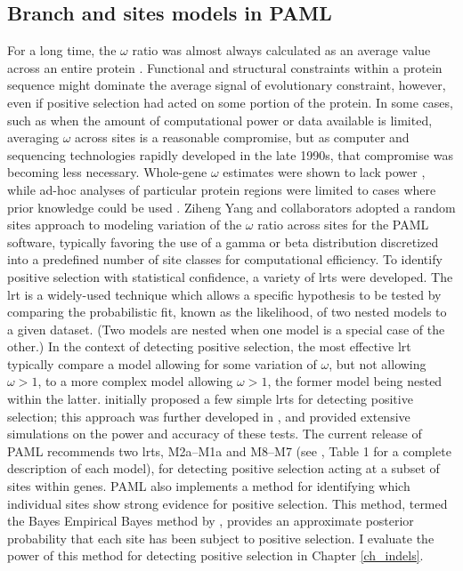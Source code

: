 \subsection{Branch and sites models in PAML}

For a long time, the $\omega$ ratio was almost always calculated as an
average value across an entire protein \citep{Sharp1997}. Functional
and structural constraints within a protein sequence might dominate
the average signal of evolutionary constraint, however, even if
positive selection had acted on some portion of the protein. In some
cases, such as when the amount of computational power or data
available is limited, averaging $\omega$ across sites is a reasonable
compromise, but as computer and sequencing technologies rapidly
developed in the late 1990s, that compromise was becoming less
necessary. Whole-gene $\omega$ estimates were shown to lack power
\citep{Endo1996}, while ad-hoc analyses of particular protein regions
were limited to cases where prior knowledge could be used
\citep{Hughes1988}. Ziheng Yang and collaborators adopted a random
sites approach to modeling variation of the $\omega$ ratio across
sites for the PAML software, typically favoring the use of a gamma or
beta distribution discretized into a predefined number of site classes
for computational efficiency. To identify positive selection with
statistical confidence, a variety of \acp{lrt} were developed. The
\ac{lrt} is a widely-used technique which allows a specific hypothesis
to be tested by comparing the probabilistic fit, known as the
likelihood, of two nested models to a given dataset. (Two models are
nested when one model is a special case of the other.) In the context
of detecting positive selection, the most effective \ac{lrt} typically
compare a model allowing for some variation of $\omega$, but not
allowing $\omega>1$, to a more complex model allowing $\omega>1$, the
former model being nested within the latter. \citet{Nielsen1998}
initially proposed a few simple \acp{lrt} for detecting positive
selection; this approach was further developed in
\citet{Yang2000CodonSubstitution}, and \citet{Anisimova2001Accuracy}
provided extensive simulations on the power and accuracy of these
tests. The current release of PAML recommends two \acp{lrt}, M2a--M1a
and M8--M7 (see \citet{Wong2004}, Table 1 for a complete description
of each model), for detecting positive selection acting at a subset of
sites within genes. PAML also implements a method for identifying
which individual sites show strong evidence for positive
selection. This method, termed the Bayes Empirical Bayes method by
\citet{Yang2005Bayes}, provides an approximate posterior probability
that each site has been subject to positive selection. I evaluate the
power of this method for detecting \sw positive selection in Chapter
\ref{ch_indels}.

